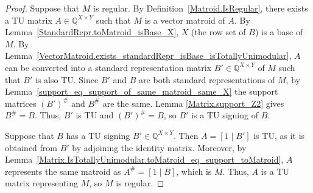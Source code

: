 \begin{proof}
    \leanok
    Suppose that $M$ is regular. By Definition~\ref{Matroid.IsRegular}, there exists a TU matrix $A \in \mathbb{Q}^{X \times Y}$ such that $M$ is a vector matroid of $A$. By Lemma~\ref{StandardRepr.toMatroid_isBase_X}, $X$ (the row set of $B$) is a base of $M$. By Lemma~\ref{VectorMatroid.exists_standardRepr_isBase_isTotallyUnimodular}, $A$ can be converted into a standard representation matrix $B' \in \mathbb{Q}^{X \times Y}$ of $M$ such that $B'$ is also TU. Since $B'$ and $B$ are both standard representations of $M$, by Lemma~\ref{support_eq_support_of_same_matroid_same_X} the support matrices $(B')^{\#}$ and $B^{\#}$ are the same. Lemma \ref{Matrix.support_Z2} gives $B^{\#} = B$. Thus, $B'$ is TU and $(B')^{\#} = B$, so $B'$ is a TU signing of $B$.

    Suppose that $B$ has a TU signing $B' \in \mathbb{Q}^{X \times Y}$. Then $A = [1 \mid B']$ is TU, as it is obtained from $B'$ by adjoining the identity matrix. Moreover, by Lemma~\ref{Matrix.IsTotallyUnimodular.toMatroid_eq_support_toMatroid}, $A$ represents the same matroid as $A^{\#} = [1 \mid B]$, which is $M$. Thus, $A$ is a TU matrix representing $M$, so $M$ is regular.
\end{proof}
